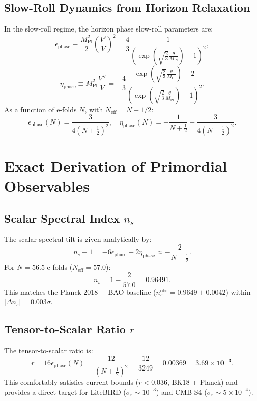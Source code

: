 \documentclass[11pt,a4paper]{article}
\begin{document}
\subsection{Slow-Roll Dynamics from Horizon Relaxation}
In the slow-roll regime, the horizon phase slow-roll parameters are:
\begin{equation}
\epsilon_{\mathrm{phase}} \equiv \frac{M_{\mathrm{Pl}}^2}{2} \left(\frac{V'}{V}\right)^2 = \frac{4}{3} \frac{1}{\left( \exp\left(\sqrt{\frac{2}{3}}\frac{\theta}{M_{\mathrm{Pl}}}\right) - 1 \right)^2},
\end{equation}
\begin{equation}
\eta_{\mathrm{phase}} \equiv M_{\mathrm{Pl}}^2 \frac{V''}{V} = -\frac{4}{3} \frac{\exp\left(\sqrt{\frac{2}{3}}\frac{\theta}{M_{\mathrm{Pl}}}\right) - 2}{\left( \exp\left(\sqrt{\frac{2}{3}}\frac{\theta}{M_{\mathrm{Pl}}}\right) - 1 \right)^2}.
\end{equation}
As a function of e-folds $N$, with $N_{\mathrm{eff}} = N + 1/2$:
\begin{equation}
\epsilon_{\mathrm{phase}}(N) = \frac{3}{4 \left(N + \frac{1}{2}\right)^2}, \quad \eta_{\mathrm{phase}}(N) = -\frac{1}{N + \frac{1}{2}} + \frac{3}{4 \left(N + \frac{1}{2}\right)^2}.
\end{equation}

\section{Exact Derivation of Primordial Observables}

\subsection{Scalar Spectral Index $n_s$}
The scalar spectral tilt is given analytically by:
\begin{equation}
n_s - 1 = -6\epsilon_{\mathrm{phase}} + 2\eta_{\mathrm{phase}} \approx -\frac{2}{N + \frac{1}{2}}.
\end{equation}
For $N = 56.5$ e-folds ($N_{\mathrm{eff}} = 57.0$):
\begin{equation}
n_s = 1 - \frac{2}{57.0} = \mathbf{0.96491}.
\end{equation}
This matches the Planck 2018 + BAO baseline ($n_s^{\mathrm{obs}} = \mathbf{0.9649 \pm 0.0042}$) within $|\Delta n_s| = 0.003\sigma$.

\subsection{Tensor-to-Scalar Ratio $r$}
The tensor-to-scalar ratio is:
\begin{equation}
r = 16 \epsilon_{\mathrm{phase}}(N) = \frac{12}{\left(N + \frac{1}{2}\right)^2} = \frac{12}{3249} = \mathbf{0.00369} = \mathbf{3.69 \times 10^{-3}}.
\end{equation}
This comfortably satisfies current bounds ($r < 0.036$, BK18 + Planck) and provides a direct target for LiteBIRD ($\sigma_r \sim 10^{-3}$) and CMB-S4 ($\sigma_r \sim 5 \times 10^{-4}$).
\end{document}
